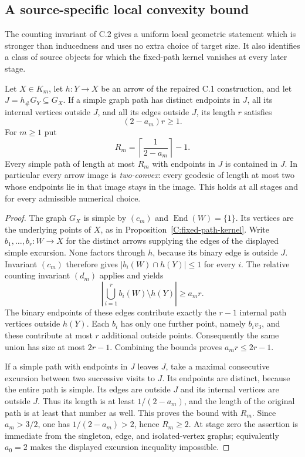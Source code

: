 \subsection{A source-specific local convexity bound}

The counting invariant of C.2 gives a uniform local geometric statement
which is stronger than inducedness and uses no extra choice of target
size.  It also identifies a class of source objects for which the
fixed-path kernel vanishes at every later stage.

\begin{proposition}
\label{C:local-convexity}
Let $X\in K_m$, let $h:Y\to X$ be an arrow of the repaired C.1
construction, and let $J=h_\#G_Y\subseteq G_X$.  If a simple graph
path has distinct endpoints in $J$, all its internal vertices outside
$J$, and all its edges outside $J$, its length $r$ satisfies
\[
             (2-a_m)r\geq1.
\]
For $m\geq1$ put
\[
       R_m=\left\lceil\frac1{2-a_m}\right\rceil-1.
\]
Every simple path of length at most $R_m$ with endpoints in $J$
is contained in $J$.  In particular every arrow image is
\emph{two-convex}: every geodesic of length at most two whose
endpoints lie in that image stays in the image.  This holds at all
stages and for every admissible numerical choice.
\end{proposition}

\begin{proof}
The graph $G_X$ is simple by $(c_m)$ and
$\operatorname{End}(W)=\{1\}$.  Its vertices are the underlying
points of $X$, as in Proposition~\ref{C:fixed-path-kernel}.
Write $b_1,\ldots,b_r:W\to X$ for the distinct arrows supplying
the edges of the displayed simple excursion.  None factors through
$h$, because its binary edge is outside $J$.  Invariant $(c_m)$
therefore gives $|b_i(W)\cap h(Y)|\leq1$ for every $i$.
The relative counting invariant $(d_m)$ applies and yields
\[
       \left|\bigcup_{i=1}^r b_i(W)\setminus h(Y)\right|
                      \geq a_m r.
\]
The binary endpoints of these edges contribute exactly the $r-1$
internal path vertices outside $h(Y)$.  Each $b_i$ has only one
further point, namely $b_iv_3$, and these contribute at most $r$
additional outside points.  Consequently the same union has size
at most $2r-1$.  Combining the bounds proves
$a_m r\leq2r-1$.

If a simple path with endpoints in $J$ leaves $J$, take a maximal
consecutive excursion between two successive visits to $J$.
Its endpoints are distinct, because the entire path is simple.
Its edges are outside $J$ and its internal vertices are outside
$J$.  Thus its length is at least $1/(2-a_m)$, and the length of
the original path is at least that number as well.  This proves
the bound with $R_m$.  Since $a_m>3/2$, one has
$1/(2-a_m)>2$, hence $R_m\geq2$.  At stage zero the assertion is
immediate from the singleton, edge, and isolated-vertex graphs;
equivalently $a_0=2$ makes the displayed excursion inequality
impossible.
\end{proof}

